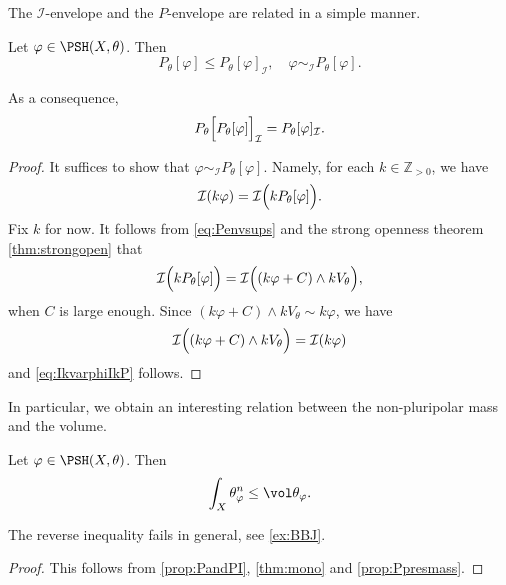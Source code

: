 The $\mathcal{I}$-envelope and the $P$-envelope are related in a simple manner.
\begin{proposition}\label{prop:PandPI}
    Let $\varphi\in \PSH(X,\theta)$. Then
    \[
        P_{\theta}[\varphi]\leq P_{\theta}[\varphi]_{\mathcal{I}},\quad \varphi \sim_{\mathcal{I}}P_{\theta}[\varphi].
    \]
\end{proposition}
As a consequence,
\begin{equation}\label{eq:PthetaIP_comp}
    P_{\theta}\Bigl[P_{\theta}[\varphi]\Bigr]_{\mathcal{I}}=P_{\theta}[\varphi]_{\mathcal{I}}.
\end{equation}
\begin{proof}
    It suffices to show that $\varphi\sim_{\mathcal{I}} P_{\theta}[\varphi]$. Namely, for each $k\in \mathbb{Z}_{>0}$, we have
    \begin{equation}\label{eq:IkvarphiIkP}
        \mathcal{I}(k\varphi)=\mathcal{I}\Bigl(kP_{\theta}[\varphi]\Bigr).
    \end{equation}
    Fix $k$ for now.
    It follows from \eqref{eq:Penvsups} and the strong openness theorem \cref{thm:strongopen} that
    \[
        \mathcal{I}\Bigl(kP_{\theta}[\varphi]\Bigr)=\mathcal{I}\Bigl((k\varphi+C)\land kV_{\theta}\Bigr),
    \]
    when $C$ is large enough. Since $(k\varphi+C)\land kV_{\theta}\sim k\varphi$, we have
    \[
        \mathcal{I}\Bigl((k\varphi+C)\land kV_{\theta}\Bigr)=\mathcal{I}(k\varphi)
    \]
    and \eqref{eq:IkvarphiIkP} follows.
\end{proof}

In particular, we obtain an interesting relation between the non-pluripolar mass and the volume.
\begin{corollary}\label{cor:compnppmassandvol}
    Let $\varphi\in \PSH(X,\theta)$. Then
    \[
        \int_X \theta_{\varphi}^n\leq \vol \theta_{\varphi}.
    \]
\end{corollary}
The reverse inequality fails in general, see \cref{ex:BBJ}.
\begin{proof}
    This follows from \cref{prop:PandPI}, \cref{thm:mono} and \cref{prop:Ppresmass}.
\end{proof}


